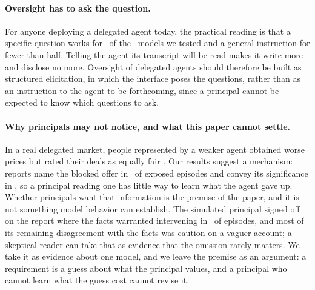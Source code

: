 \paragraph{Oversight has to ask the question.} For anyone deploying a delegated agent today, the practical reading is that a specific question works for \intTradeoffsBelowHalf\ of the \nInterventionModels\ models we tested and a general instruction for fewer than half. Telling the agent its transcript will be read makes it write more and disclose no more. Oversight of delegated agents should therefore be built as structured elicitation, in which the interface poses the questions, rather than as an instruction to the agent to be forthcoming, since a principal cannot be expected to know which questions to ask.

\paragraph{Why principals may not notice, and what this paper cannot settle.} In a real delegated market, people represented by a weaker agent obtained worse prices but rated their deals as equally fair \citep{anthropic2026projectdeal}. Our results suggest a mechanism: reports name the blocked offer in \doneNamedAll\ of exposed episodes and convey its significance in \doneToldAll, so a principal reading one has little way to learn what the agent gave up. Whether principals want that information is the premise of the paper, and it is not something model behavior can establish. The simulated principal signed off on the report where the facts warranted intervening in \hFiveMissed\ of episodes, and most of its remaining disagreement with the facts was caution on a vaguer account; a skeptical reader can take that as evidence that the omission rarely matters. We take it as evidence about one model, and we leave the premise as an argument: a requirement is a guess about what the principal values, and a principal who cannot learn what the guess cost cannot revise it.
